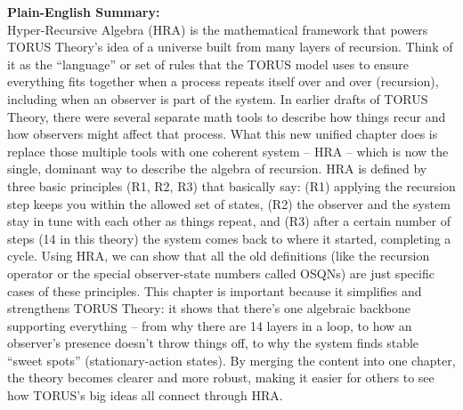 \documentclass[]{article}
\begin{document}
\textbf{Plain-English Summary:}\\
Hyper-Recursive Algebra (HRA) is the mathematical framework that powers
TORUS Theory's idea of a universe built from many layers of recursion.
Think of it as the ``language'' or set of rules that the TORUS model
uses to ensure everything fits together when a process repeats itself
over and over (recursion), including when an observer is part of the
system. In earlier drafts of TORUS Theory, there were several separate
math tools to describe how things recur and how observers might affect
that process. What this new unified chapter does is replace those
multiple tools with one coherent system -- HRA -- which is now the
single, dominant way to describe the algebra of recursion. HRA is
defined by three basic principles (R1, R2, R3) that basically say: (R1)
applying the recursion step keeps you within the allowed set of states,
(R2) the observer and the system stay in tune with each other as things
repeat, and (R3) after a certain number of steps (14 in this theory) the
system comes back to where it started, completing a cycle. Using HRA, we
can show that all the old definitions (like the recursion operator or
the special observer-state numbers called OSQNs) are just specific cases
of these principles. This chapter is important because it simplifies and
strengthens TORUS Theory: it shows that there's one algebraic backbone
supporting everything -- from why there are 14 layers in a loop, to how
an observer's presence doesn't throw things off, to why the system finds
stable ``sweet spots'' (stationary-action states). By merging the
content into one chapter, the theory becomes clearer and more robust,
making it easier for others to see how TORUS's big ideas all connect
through HRA.
\end{document}
